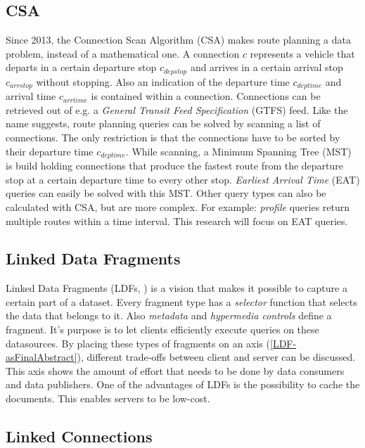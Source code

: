\documentclass[twocolumn]{phdsymp} %
\begin{document}
\subsection{CSA}
\label{csa}
Since 2013, the Connection Scan Algorithm (CSA) \cite{csa} makes route planning a data problem, instead of a mathematical one. 
A connection $c$ represents a vehicle that departs in a certain departure stop $c_{depstop}$ and arrives in a certain arrival stop $c_{arrstop}$ without stopping. Also an indication of the departure time $c_{deptime}$ and arrival time $c_{arrtime}$ is contained within a connection. Connections can be retrieved out of e.g. a \textit{General Transit Feed Specification} (GTFS) feed. Like the name suggests, route planning queries can be solved by scanning a list of connections. The only restriction is that the connections have to be sorted by their departure time $c_{deptime}$. While scanning, a Minimum Spanning Tree (MST) is build holding connections that produce the fastest route from the departure stop at a certain departure time to every other stop. \textit{Earliest Arrival Time} (EAT) queries can easily be solved with this MST. Other query types can also be calculated with CSA, but are more complex. For example: \textit{profile} queries return multiple routes within a time interval. This research will focus on EAT queries.

\subsection{Linked Data Fragments}
Linked Data Fragments (LDFs, \cite{verborgh_ldow_2014}) is a vision that makes it possible to capture a certain part of a dataset. Every fragment type has a \textit{selector} function that selects the data that belongs to it. Also \textit{metadata} and \textit{hypermedia controls} define a fragment. It's purpose is to let clients efficiently execute queries on these datasources. By placing these types of fragments on an axis (\cref{LDF-asFinalAbstract}), different trade-offs between client and server can be discussed. This axis shows the amount of effort that needs to be done by data consumers and data publishers. One of the advantages of LDFs is the possibility to cache the documents. This enables servers to be low-cost.

\subsection{Linked Connections}
\label{lc}
\end{document}
